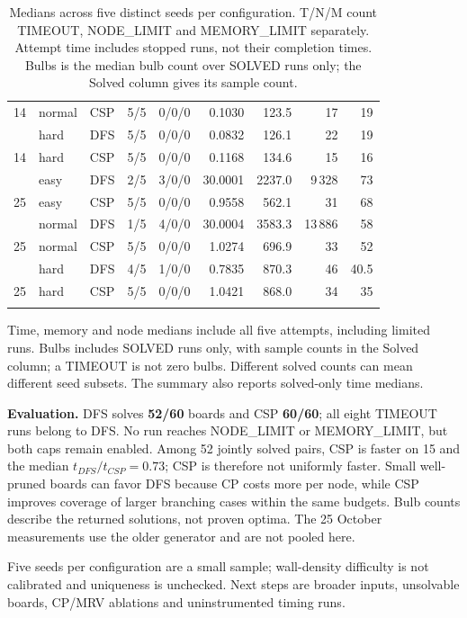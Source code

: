 \begin{table}[htbp]
\begin{tabular}{@{}rllccrrrr@{}}
14 & normal & CSP & 5/5 & 0/0/0 & 0.1030 & 123.5 & 17 & 19\\
\addlinespace[2pt]
14 & hard & DFS & 5/5 & 0/0/0 & 0.0832 & 126.1 & 22 & 19\\
14 & hard & CSP & 5/5 & 0/0/0 & 0.1168 & 134.6 & 15 & 16\\
\addlinespace[2pt]
25 & easy & DFS & 2/5 & 3/0/0 & 30.0001 & 2237.0 & 9\,328 & 73\\
25 & easy & CSP & 5/5 & 0/0/0 & 0.9558 & 562.1 & 31 & 68\\
\addlinespace[2pt]
25 & normal & DFS & 1/5 & 4/0/0 & 30.0004 & 3583.3 & 13\,886 & 58\\
25 & normal & CSP & 5/5 & 0/0/0 & 1.0274 & 696.9 & 33 & 52\\
\addlinespace[2pt]
25 & hard & DFS & 4/5 & 1/0/0 & 0.7835 & 870.3 & 46 & 40.5\\
25 & hard & CSP & 5/5 & 0/0/0 & 1.0421 & 868.0 & 34 & 35\\
\addlinespace[2pt]
\bottomrule
\end{tabular}
\caption{Medians across five distinct seeds per configuration. T/N/M count TIMEOUT, NODE\_LIMIT and MEMORY\_LIMIT separately. Attempt time includes stopped runs, not their completion times. Bulbs is the median bulb count over SOLVED runs only; the Solved column gives its sample count.}
\label{tab:lightup-dfs-csp-en}
\end{table}
Time, memory and node medians include all five attempts, including limited
runs. Bulbs includes SOLVED runs only, with sample counts in the Solved column;
a TIMEOUT is not zero bulbs. Different solved counts can mean different seed
subsets. The summary also reports solved-only time medians.

\textbf{Evaluation.} DFS solves \textbf{52/60} boards and CSP \textbf{60/60}; all
eight TIMEOUT runs belong to DFS. No run reaches NODE\_LIMIT or MEMORY\_LIMIT,
but both caps remain enabled. Among 52 jointly solved pairs, CSP is faster on
15 and the median $t_{DFS}/t_{CSP}=0.73$; CSP is therefore not uniformly faster.
Small well-pruned boards can favor DFS because CP costs more per node, while
CSP improves coverage of larger branching cases within the same budgets.
Bulb counts describe the returned solutions, not proven optima. The 25 October
measurements use the older generator and are not pooled here.

Five seeds per configuration are a small sample; wall-density difficulty is
not calibrated and uniqueness is unchecked. Next steps are broader inputs,
unsolvable boards, CP/MRV ablations and uninstrumented timing runs.

